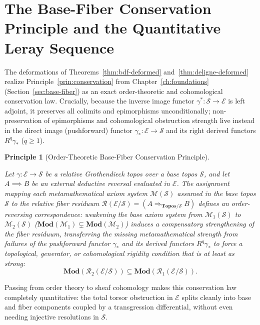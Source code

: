 \documentclass[10pt,twoside,openright]{book}
\theoremstyle{crmplain}
\newtheorem{principle}[theorem]{Principle}
\theoremstyle{crmdef}
\theoremstyle{crmremark}
\begin{document}
\section{The Base-Fiber Conservation Principle and the Quantitative Leray Sequence}

The deformations of Theorems~\ref{thm:bdf-deformed} and~\ref{thm:deligne-deformed} realize Principle~\ref{prin:conservation} from Chapter~\ref{ch:foundations} (Section~\ref{sec:base-fiber}) as an exact order-theoretic and cohomological conservation law. Crucially, because the inverse image functor $\gamma^* : \mathcal{S} \to \mathcal{E}$ is left adjoint, it preserves all colimits and epimorphisms unconditionally; non-preservation of epimorphisms and cohomological obstruction strength live instead in the direct image (pushforward) functor $\gamma_* : \mathcal{E} \to \mathcal{S}$ and its right derived functors $R^q\gamma_*$ ($q \ge 1$).

\begin{principle}[Order-Theoretic Base-Fiber Conservation Principle]\label{thm:conservation-law}

Let $\gamma: \mathcal{E} \to \mathcal{S}$ be a relative Grothendieck topos over a base topos $\mathcal{S}$, and let $A \implies B$ be an external deductive reversal evaluated in $\mathcal{E}$. The assignment mapping each metamathematical axiom system $\mathcal{M}(\mathcal{S})$ assumed in the base topos $\mathcal{S}$ to the relative fiber residuum $\mathcal{R}(\mathcal{E}/\mathcal{S}) = (A \Rightarrow_{\mathbf{Topos}/\mathcal{S}} B)$ defines an order-reversing correspondence: weakening the base axiom system from $\mathcal{M}_1(\mathcal{S})$ to $\mathcal{M}_2(\mathcal{S})$ ($\mathbf{Mod}(\mathcal{M}_1) \subsetneq \mathbf{Mod}(\mathcal{M}_2)$) induces a compensatory strengthening of the fiber residuum, transferring the missing metamathematical strength from failures of the pushforward functor $\gamma_*$ and its derived functors $R^q\gamma_*$ to force a topological, generator, or cohomological rigidity condition that is at least as strong:
\[
  \mathbf{Mod}(\mathcal{R}_2(\mathcal{E}/\mathcal{S})) \subseteq \mathbf{Mod}(\mathcal{R}_1(\mathcal{E}/\mathcal{S})).
\]

\end{principle}

Passing from order theory to sheaf cohomology makes this conservation law completely quantitative: the total torsor obstruction in $\mathcal{E}$ splits cleanly into base and fiber components coupled by a transgression differential, without even needing injective resolutions in $\mathcal{S}$.
\end{document}
